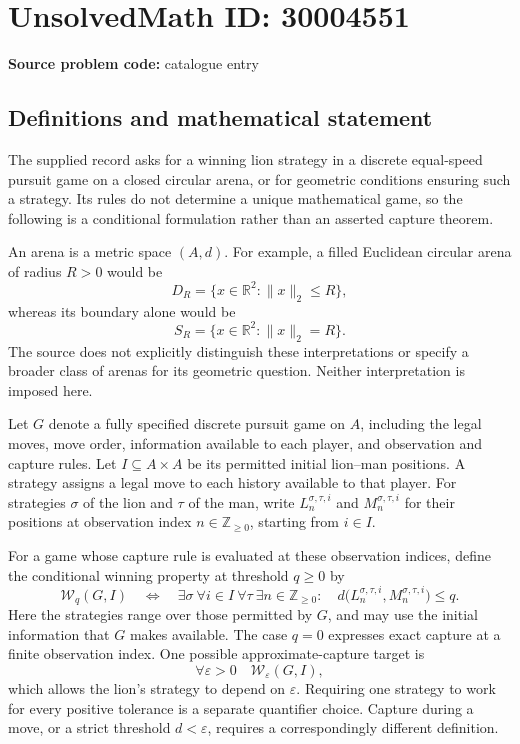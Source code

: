 \documentclass[11pt]{article}
\newcommand{\Z}{\mathbb{Z}}
\newcommand{\R}{\mathbb{R}}
\begin{document}
\section*{UnsolvedMath ID: 30004551}
\textbf{Source problem code:} catalogue entry
\subsection{Definitions and mathematical statement}
The supplied record asks for a winning lion strategy in a discrete equal-speed pursuit game on a closed circular arena, or for geometric conditions ensuring such a strategy. Its rules do not determine a unique mathematical game, so the following is a conditional formulation rather than an asserted capture theorem.

An arena is a metric space \((A,d)\). For example, a filled Euclidean circular arena of radius \(R>0\) would be
\[
D_R=\{x\in\R^2:\|x\|_2\le R\},
\]
whereas its boundary alone would be
\[
S_R=\{x\in\R^2:\|x\|_2=R\}.
\]
The source does not explicitly distinguish these interpretations or specify a broader class of arenas for its geometric question. Neither interpretation is imposed here.

Let \(G\) denote a fully specified discrete pursuit game on \(A\), including the legal moves, move order, information available to each player, and observation and capture rules. Let \(I\subseteq A\times A\) be its permitted initial lion--man positions. A strategy assigns a legal move to each history available to that player. For strategies \(\sigma\) of the lion and \(\tau\) of the man, write \(L_n^{\sigma,\tau,i}\) and \(M_n^{\sigma,\tau,i}\) for their positions at observation index \(n\in\Z_{\ge0}\), starting from \(i\in I\).

For a game whose capture rule is evaluated at these observation indices, define the conditional winning property at threshold \(q\ge0\) by
\[
\mathcal W_q(G,I)\quad\Longleftrightarrow\quad
\exists\sigma\ \forall i\in I\ \forall\tau\ \exists n\in\Z_{\ge0}:\quad
 d\bigl(L_n^{\sigma,\tau,i},M_n^{\sigma,\tau,i}\bigr)\le q.
\]
Here the strategies range over those permitted by \(G\), and may use the initial information that \(G\) makes available. The case \(q=0\) expresses exact capture at a finite observation index. One possible approximate-capture target is
\[
\forall\varepsilon>0\quad\mathcal W_\varepsilon(G,I),
\]
which allows the lion's strategy to depend on \(\varepsilon\). Requiring one strategy to work for every positive tolerance is a separate quantifier choice. Capture during a move, or a strict threshold \(d<\varepsilon\), requires a correspondingly different definition.
\end{document}
